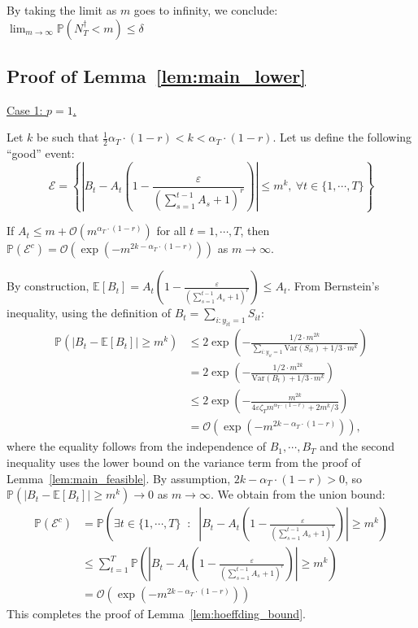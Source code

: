 \documentclass[nonblindrev]{informs3noheader}
\def\P{\mathbb{P}}
\def\calE{\mathcal{E}}
\def\calO{\mathcal{O}}
\begin{document}
By taking the limit as $m$ goes to infinity, we conclude: $\lim_{m \to \infty}\P\left(N^\dagger_T<m\right)\leq\delta$
\hfill\Halmos

\subsection{Proof of Lemma~\ref{lem:main_lower}}
\label{app:unif_prob_bin_determin_sto}

\underline{Case 1: $p=1$.}

Let $k$ be such that $\frac{1}{2}\alpha_T\cdot(1-r)<k<\alpha_T\cdot(1-r)$. Let us define the following ``good'' event:
$$\calE=\left\{\left|B_t - A_t \left(1 -\frac{\varepsilon}{\left(\sum_{s=1}^{t-1} A_s +1\right)^r}\right)\right|\leq m^k,\ \forall t \in \{1,\cdots, T\}\right\}$$

\begin{lemma}\label{lem:hoeffding_bound}
    If $A_t\leq m+ \calO(m^{\alpha_T \cdot (1-r)})$ for all $t=1,\cdots, T$, then $\P(\calE^c) =\calO(\exp\left(-m^{2k-\alpha_T\cdot(1-r)}\right))$ as $m \to \infty$.
\end{lemma}
    By construction, $\mathbb{E}[B_t] = A_t \left(1 -\frac{\varepsilon}{\left(\sum_{s=1}^{t-1} A_s +1\right)^r}\right)\leq A_t$. From Bernstein's inequality, using the definition of $B_t=\sum_{i:y_{it}=1}S_{it}$:
    \begin{align*}
        \P(|B_t - \mathbb{E}[B_t]| \geq m^k)
        &\leq 2\exp\left(-\frac{1/2\cdot m^{2k}}{\sum_{i:y_{it}=1}\text{Var}(S_{it})+1/3\cdot m^k}\right)\\
        &= 2\exp\left(-\frac{1/2\cdot m^{2k}}{\text{Var}(B_t)+1/3\cdot m^k}\right)\\
        &\leq 2\exp\left(-\frac{m^{2k}}{4\varepsilon \zeta_T m^{\alpha_T\cdot(1-r)} + 2m^k/3}\right)\\
        &= \calO\left(\exp\left(-m^{2k-\alpha_T\cdot(1-r)}\right)\right),
    \end{align*}
    where the equality follows from the independence of $B_1,\cdots,B_T$ and the second inequality uses the lower bound on the variance term from the proof of Lemma~\ref{lem:main_feasible}. By assumption, $2k - \alpha_T\cdot(1-r) > 0$, so $\P\left(|B_t - \mathbb{E}[B_t]| \geq m^k\right) \to 0$ as $m \to \infty$. We obtain from the union bound:
\begin{align*}
    \P(\calE^c)
    &=\P\left(\exists t \in \{1,\cdots, T\} \;\; : \;\; \left|B_t - A_t \left(1 -\frac{\varepsilon}{\left(\sum_{s=1}^{t-1} A_s +1\right)^r}\right)\right|\geq m^k\right)\\
    &\leq \sum_{t=1}^T \P\left(\left|B_t - A_t \left(1 -\frac{\varepsilon}{\left(\sum_{s=1}^{t-1} A_s +1\right)^r}\right)\right|\geq m^k\right)\\
    & =\calO(\exp\left(-m^{2k-\alpha_T\cdot(1-r)}\right))
\end{align*}
This completes the proof of Lemma~\ref{lem:hoeffding_bound}.\hfill\Halmos\endproof
\end{document}
